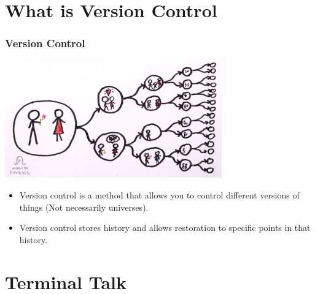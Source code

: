 \documentclass{beamer}
\begin{document}

\section{What is Version Control}

\begin{frame}[fragile]
\frametitle{Version Control}
\begin{center}\includegraphics[width=0.7\textwidth]{Multiverse.jpg}\end{center}
\begin{itemize}
\item Version control is a method that allows you to control different versions of things (Not necessarily universes).
\item Version control stores history and allows restoration to specific points in that history.
\end{itemize}

\end{frame}

\section{Terminal Talk}
\end{document}
